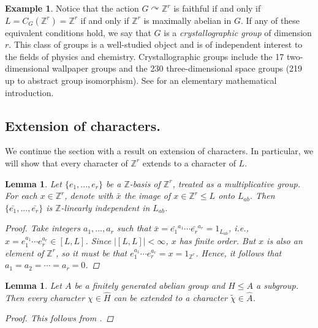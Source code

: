 \documentclass[11pt, twoside]{amsart}
\newcommand{\zn}{\mathbb{Z}}
\newtheorem{lemma}[thm]{Lemma}
\theoremstyle{definition}
\newtheorem{ex}[thm]{Example}
\newcommand{\B}{\mathbb}
\newcommand{\Z}{\B{Z}}
\begin{document}
\begin{ex}\label{example:crystallographic_group_defn}
Notice that the action $G\curvearrowright \Z^r$ is faithful if and only if $L=C_G(\Z^r)=\Z^r$ if and only if $\Z^r$ is maximally abelian in $G$. If any of these equivalent conditions hold, we say that $G$ is a {\em crystallographic group} of dimension $r$. This class of groups is a well-studied object and is of independent interest to the fields of physics and chemistry. Crystallographic groups include the 17 two-dimensional wallpaper groups and the 230 three-dimensional space groups (219 up to abstract group isomorphism). See \cite{Hil86} for an elementary mathematical introduction. \par
\end{ex}

 \subsection{Extension of characters.}\label{subsec:extension_of_characters}
We continue the section with a result on extension of characters. In particular, we will show that every character of $\Z^r$ extends to a character of $L$. \par

\begin{lemma}\label{basic_lemma_11}
     Let $\{e_1,...,e_r\}$ be a $\Z$-basis of $\Z^r$, treated as a multiplicative group. For each $x\in\Z^r$, denote with $\bar{x}$ the image of $x\in \Z^r\leq L$ onto $L_{ab}$. Then $\{\bar{e_1},...,\bar{e_r}\}$ is $\Z$-linearly independent in $L_{ab}$.
     \begin{proof}
         Take integers $a_1,...,a_r$ such that $\bar{x}=\bar{e_1}^{a_1}\cdots\bar{e_r}^{a_r}=1_{L_{ab}}$, i.e., $x=e_1^{a_1}\cdots e_r^{a_r}\in [L,L]$. Since $|[L,L]|<\infty$, $x$ has finite order. But $x$ is also an element of $\Z^r$, so it must be that $e_1^{a_1}\cdots e_r^{a_r}=x=1_{\zn^r}$. Hence, it follows that $a_1=a_2=\cdots=a_r=0$.
     \end{proof}
 \end{lemma}
 
\begin{lemma}\label{basic_lemma_12}
     Let $A$ be a finitely generated abelian group and $H\leq A$ a subgroup. Then every character $\chi\in \widehat{H}$ can be extended to a character $\widetilde{\chi}\in \widehat{A}$.
     \begin{proof}
        This follows from \cite[Cor. 3.6.2]{principles_of_harm_anal_book}. \qedhere
         
     \end{proof}
    
 \end{lemma}
\end{document}
